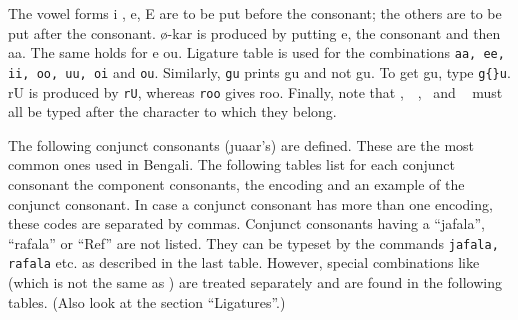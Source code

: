  The vowel forms {\bn i , e, E} are to be put
before the consonant; the others are to be put after the consonant.
{\bn \o}-kar is produced by putting {\bn e}, the consonant and
then {\bn aa}. The same holds for {\bn e ou}. Ligature table is
used for the combinations {\tt aa, ee, ii, oo, uu, oi} and {\tt ou}. Similarly,
{\tt gu} prints {\bn gu} and not {\bn g{}u}. To get {\bn g{}u}, type
{\tt g\{\}u}. {\bn rU} is produced by {\tt rU}, whereas
{\tt roo} gives {\bn roo}. Finally, note that \hbox{\bn \jafala,\ \
\rafala, \Ref} and {\bn\ \hasanta} must all be typed after the
character to which they belong.

The following conjunct consonants ({\bn \j u\kt aa\kkh r'}s) are defined.
These are the most common ones used in Bengali. The following
tables list for each conjunct consonant the component consonants,
the encoding and an example of
the conjunct consonant. In case a conjunct consonant has more than
one encoding, these codes are separated by commas. Conjunct consonants
having a ``jafala'', ``rafala'' or ``Ref'' are not listed. They can
be typeset by the commands {\tt \bs jafala, \bs rafala} etc. as described
in the last table. However, special combinations like {\bn \bhr} (which
is not the same as {\bn \bh{}\rf}) are treated separately and are found in
the following tables. (Also look at the section ``Ligatures''.)
\vfill \break
